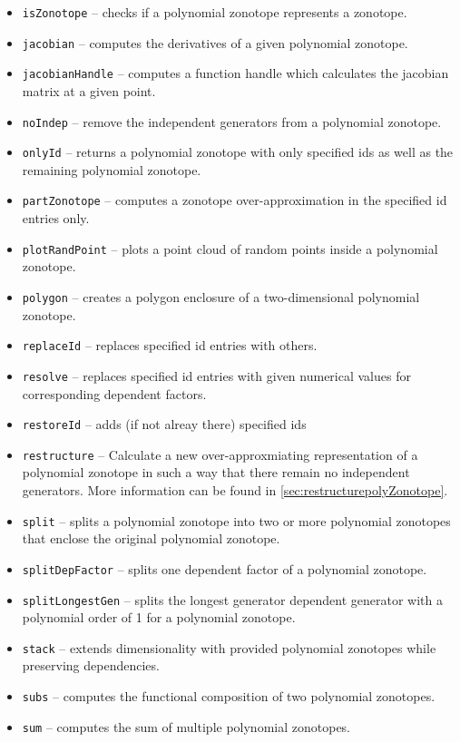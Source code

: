 \begin{itemize}
    \item \texttt{isZonotope} -- checks if a polynomial zonotope represents a zonotope.
    \item \texttt{jacobian} -- computes the derivatives of a given polynomial zonotope.
    \item \texttt{jacobianHandle} -- computes a function handle which calculates the jacobian matrix at a given point.
    \item \texttt{noIndep} -- remove the independent generators from a polynomial zonotope.
    \item \texttt{onlyId} -- returns a polynomial zonotope with only specified ids as well as the remaining polynomial zonotope.
    \item \texttt{partZonotope} -- computes a zonotope over-approximation in the specified id entries only.
    \item \texttt{plotRandPoint} -- plots a point cloud of random points inside a polynomial zonotope.
    \item \texttt{polygon} -- creates a polygon enclosure of a two-dimensional polynomial zonotope.
    \item \texttt{replaceId} -- replaces specified id entries with others.
    \item \texttt{resolve} -- replaces specified id entries with given numerical values for corresponding dependent factors.
    \item \texttt{restoreId} -- adds (if not alreay there) specified ids
    \item \texttt{restructure} -- Calculate a new over-approxmiating representation of a polynomial zonotope in such a way that there remain no independent generators. More information can be found in \cref{sec:restructurepolyZonotope}.
    \item \texttt{split} -- splits a polynomial zonotope into two or more polynomial zonotopes that enclose the original polynomial zonotope.
    \item \texttt{splitDepFactor} -- splits one dependent factor of a polynomial zonotope.
    \item \texttt{splitLongestGen} -- splits the longest generator dependent generator with a polynomial order of 1 for a polynomial zonotope.
    \item \texttt{stack} -- extends dimensionality with provided polynomial zonotopes while preserving dependencies.
    \item \texttt{subs} -- computes the functional composition of two polynomial zonotopes.
    \item \texttt{sum} -- computes the sum of multiple polynomial zonotopes.
\end{itemize}

